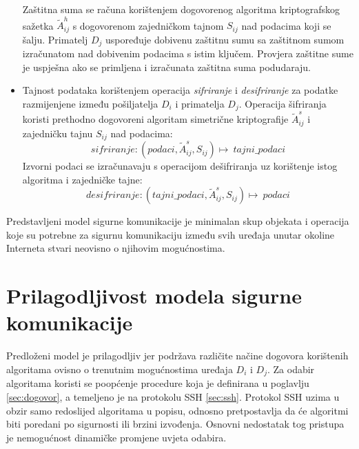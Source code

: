 \begin{itemize}
	Zaštitna suma se računa korištenjem dogovorenog algoritma kriptografskog
	sažetka $\widetilde{A}^h_{ij}$ s dogovorenom zajedničkom tajnom $S_{ij}$
	nad podacima koji se šalju.
	Primatelj $D_j$ uspoređuje dobivenu zaštitnu sumu sa zaštitnom sumom
	izračunatom nad dobivenim podacima s istim ključem. Provjera zaštitne
	sume je uspješna ako se primljena i izračunata zaštitna suma podudaraju.
	
    \item Tajnost podataka korištenjem operacija \textit{sifriranje} i
	\textit{desifriranje} za podatke razmijenjene između pošiljatelja $D_i$
	i primatelja $D_j$. Operacija šifriranja koristi prethodno dogovoreni
	algoritam simetrične kriptografije $\widetilde{A}^s_{ij}$ i zajedničku
	tajnu $S_{ij}$ nad podacima:
	\begin{equation}
	    \mathit{sifriranje}:(podaci,\widetilde{A}^s_{ij},S_{ij})\longmapsto~\mathit{tajni\_podaci}
	\end{equation}
	Izvorni podaci se izračunavaju s operacijom dešifriranja uz korištenje
	istog algoritma i zajedničke tajne:
	\begin{equation}
	    \mathit{desifriranje}:(\mathit{tajni\_podaci},\widetilde{A}^s_{ij},S_{ij})\longmapsto~podaci
	\end{equation}
\end{itemize}

Predstavljeni model sigurne komunikacije je minimalan skup objekata i operacija
koje su potrebne za sigurnu komunikaciju između svih uređaja unutar okoline
Interneta stvari neovisno o njihovim mogućnostima.

\section{Prilagodljivost modela sigurne komunikacije}
\label{sec:iotprilag}

Predloženi model je prilagodljiv jer podržava različite načine dogovora
korištenih algoritama ovisno o trenutnim mogućnostima uređaja $D_i$ i $D_j$. Za
odabir algoritama koristi se poopćenje procedure koja je definirana u poglavlju
\ref{sec:dogovor}, a temeljeno je na protokolu SSH \ref{sec:ssh}. Protokol SSH
uzima u
obzir samo redoslijed algoritama u popisu, odnosno pretpostavlja da će
algoritmi biti poredani po sigurnosti ili brzini izvođenja. Osnovni
nedostatak tog pristupa je nemogućnost dinamičke promjene uvjeta odabira.


